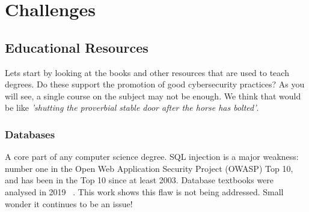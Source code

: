 \documentclass[a4paper,11pt]{article}
\begin{document}



\section*{Challenges} \label{sec}
\subsection*{Educational Resources}\label{sec:EDResource}
Lets start by looking at the books and other resources that are used to teach degrees. Do these support the promotion of good cybersecurity practices? As you will see, a single course on the subject may not be enough. We think that would be like \textit{'shutting the proverbial stable door after the horse has bolted'}. 
\subsubsection*{Databases}\label{sec:SQL}
A core part of any computer science degree. SQL injection is a major weakness: number one in the Open Web Application Security Project (OWASP) Top 10, and has been in the Top 10 since at least 2003. Database textbooks were analysed in 2019 ~\cite{Drop2019}.  This work shows this flaw is not being addressed. Small wonder it continues to be an issue!
\end{document}

